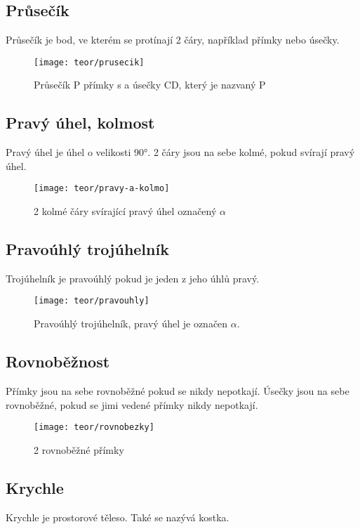 \subsection{Průsečík}
Průsečík je bod, ve kterém se protínají 2 čáry, například přímky nebo úsečky.

\begin{figure}[h]
    \caption{Průsečík P přímky s a úsečky CD, který je nazvaný P}
    \centering
    \texttt{[image: teor/prusecik]}
\end{figure}

\subsection{Pravý úhel, kolmost}
Pravý úhel je úhel o velikosti 90°. 2 čáry jsou na sebe kolmé, pokud svírají pravý úhel.

\begin{figure}[h]
    \caption{2 kolmé čáry svírající pravý úhel označený $\alpha$}
    \centering
    \texttt{[image: teor/pravy-a-kolmo]}
\end{figure}

\subsection{Pravoúhlý trojúhelník}
Trojúhelník je pravoúhlý pokud je jeden z jeho úhlů pravý.

\begin{figure}[h]
    \caption{Pravoúhlý trojúhelník, pravý úhel je označen $\alpha$.}
    \centering
    \texttt{[image: teor/pravouhly]}
\end{figure}

\subsection{Rovnoběžnost}
Přímky jsou na sebe rovnoběžné pokud se nikdy nepotkají. Úsečky jsou na sebe rovnoběžné, pokud se jimi vedené přímky nikdy nepotkají.

\begin{figure}[h]
    \caption{2 rovnoběžné přímky}
    \centering
    \texttt{[image: teor/rovnobezky]}
\end{figure}

\subsection{Krychle}
Krychle je prostorové těleso. Také se nazývá kostka.

